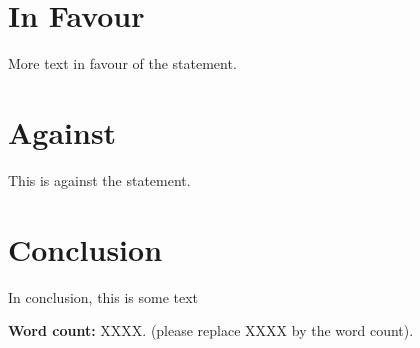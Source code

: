 \documentclass{article}
\begin{document}
\section{In Favour}
More text in favour of the statement.

\section{Against}
This is against the statement.

\section{Conclusion}
In conclusion, this is some text

\vspace{.5cm}
\noindent \textbf{Word count:} XXXX. (please replace XXXX by the word count).



\end{document}
